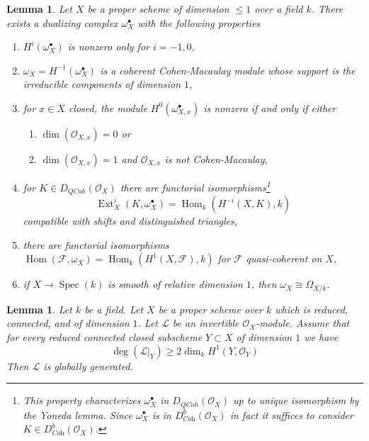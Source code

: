 \documentclass{amsart}
\theoremstyle{plain}
\newtheorem{lemma}[subsection]{Lemma}
\theoremstyle{definition}
\theoremstyle{remark}
\numberwithin{equation}{subsection}
\def\Spec{\mathop{\mathrm{Spec}}}
\def\Hom{\mathop{\mathrm{Hom}}\nolimits}
\def\Ext{\mathop{\mathrm{Ext}}\nolimits}
\def\QCoh{\mathit{QCoh}}
\begin{document}
\begin{lemma}
\label{lemma-duality-dim-1}
Let $X$ be a proper scheme of dimension $\leq 1$ over a field $k$.
There exists a dualizing complex $\omega_X^\bullet$ with the
following properties
\begin{enumerate}
\item $H^i(\omega_X^\bullet)$ is nonzero only for $i = -1, 0$,
\item $\omega_X = H^{-1}(\omega_X^\bullet)$
is a coherent Cohen-Macaulay module whose support is the
irreducible components of dimension $1$,
\item for $x \in X$ closed, the module $H^0(\omega_{X, x}^\bullet)$
is nonzero if and only if either
\begin{enumerate}
\item $\dim(\mathcal{O}_{X, x}) = 0$ or
\item $\dim(\mathcal{O}_{X, x}) = 1$
and $\mathcal{O}_{X, x}$ is not Cohen-Macaulay,
\end{enumerate}
\item for $K \in D_\QCoh(\mathcal{O}_X)$ there are functorial
isomorphisms\footnote{This property
characterizes $\omega_X^\bullet$ in $D_\QCoh(\mathcal{O}_X)$
up to unique isomorphism by the Yoneda lemma. Since $\omega_X^\bullet$
is in $D^b_{\textit{Coh}}(\mathcal{O}_X)$ in fact it suffices to consider
$K \in D^b_{\textit{Coh}}(\mathcal{O}_X)$.}
$$
\Ext^i_X(K, \omega_X^\bullet) = \Hom_k(H^{-i}(X, K), k)
$$
compatible with shifts and distinguished triangles,
\item there are functorial isomorphisms
$\Hom(\mathcal{F}, \omega_X) = \Hom_k(H^1(X, \mathcal{F}), k)$
for $\mathcal{F}$ quasi-coherent on $X$,
\item if $X \to \Spec(k)$ is smooth of relative dimension $1$,
then $\omega_X \cong \Omega_{X/k}$.
\end{enumerate}
\end{lemma}

\begin{lemma}
\label{lemma-global-generation}
Let $k$ be a field. Let $X$ be a proper scheme over $k$
which is reduced, connected, and of dimension $1$.
Let $\mathcal{L}$ be an invertible $\mathcal{O}_X$-module.
Assume that for every reduced connected closed subscheme
$Y \subset X$ of dimension $1$ we have
$$
\deg(\mathcal{L}|_Y) \geq 2\dim_k H^1(Y, \mathcal{O}_Y)
$$
Then $\mathcal{L}$ is globally generated.
\end{lemma}
\end{document}
